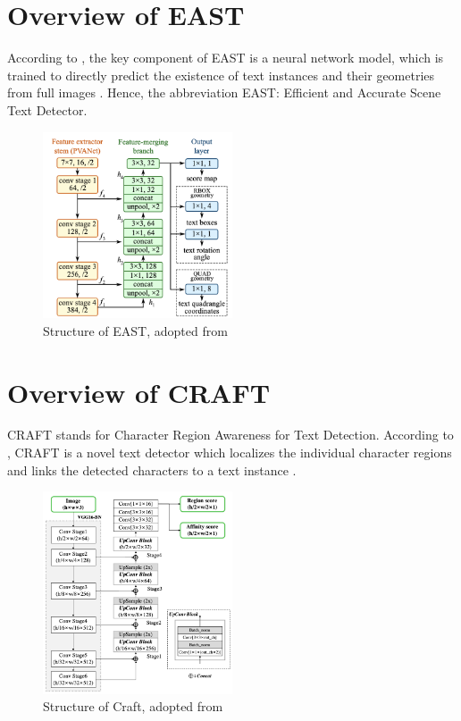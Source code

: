 \documentclass[a4paper]{article}
\begin{document}
\section{Overview of EAST} %
\label{sec:overvieweast}
According to \cite{EastZhouEtAl}, the key component of EAST is a neural network model, which is trained to directly predict the existence of text instances and their geometries from full images \citep{EastZhouEtAl}.
Hence, the abbreviation EAST: Efficient and Accurate Scene Text Detector.
\begin{figure}[h!]
	\centering
	\includegraphics[width=0.5\textwidth]{img/eaststructure.png}
	\caption{Structure of EAST, adopted from~\protect\cite{EastZhouEtAl}}
	\label{fig:east1}
\end{figure}



\section{Overview of CRAFT} %
\label{sec:overviewcraft}
CRAFT stands for Character Region Awareness for Text Detection. According to \cite{CraftBaekEtAl}, CRAFT is a novel text detector which localizes the individual character regions and links the detected characters to a text instance \citep{CraftBaekEtAl}.
\begin{figure}[h!]
	\centering
	\includegraphics[width=0.5\textwidth]{img/craftstructure.png}
	\caption{Structure of Craft, adopted from~\protect\cite{CraftBaekEtAl}}
	\label{fig:craft1}
\end{figure}
\end{document}
